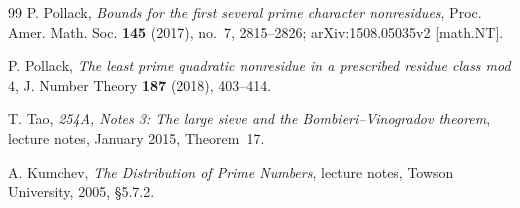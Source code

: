 \documentclass[11pt, a4paper]{article}
\theoremstyle{plain}
\theoremstyle{definition}
\begin{document}
\begin{thebibliography}{99}
 P. Pollack, \textit{Bounds for the first several prime character nonresidues}, Proc. Amer. Math. Soc. \textbf{145} (2017), no.~7, 2815--2826; arXiv:1508.05035v2 [math.NT].

 P. Pollack, \textit{The least prime quadratic nonresidue in a prescribed residue class mod $4$}, J. Number Theory \textbf{187} (2018), 403--414.

 T. Tao, \textit{254A, Notes 3: The large sieve and the Bombieri--Vinogradov theorem}, lecture notes, January 2015, Theorem~17.

 A. Kumchev, \textit{The Distribution of Prime Numbers}, lecture notes, Towson University, 2005, \S5.7.2.

\end{thebibliography}
\end{document}
